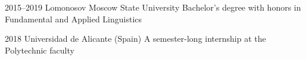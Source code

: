 \documentclass[9pt]{developercv} %
\begin{document}
\vspace{5px}

\begin{minipage}[t]{0.25\textwidth}
	\vspace{-\baselineskip}
	
	\medskip
	
	
	\divider
	
	
	\divider
	
	
	\divider
	
\end{minipage}
\hfill
\begin{minipage}[t]{0.7\textwidth}
	\vspace{-\baselineskip}
	
	\medskip
	\begin{entrylist}
		\entry
			{2015--2019}
			{\Large Lomonosov Moscow State University}
			{}
			{\large Bachelor's degree with honors in Fundamental and Applied Linguistics \\
		
			\vspace{-5px}
			}
			
		\entry
			{2018}
			{\Large Universidad de Alicante (Spain)}
			{}
			{\large A semester-long internship at the Polytechnic faculty \\
		
			\vspace{-5px}
			}
	\end{entrylist}	
\end{minipage}
\end{document}
